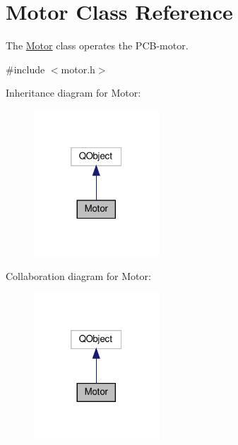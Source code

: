 \hypertarget{classMotor}{}\section{Motor Class Reference}
\label{classMotor}


The \hyperlink{classMotor}{Motor} class operates the P\+C\+B-\/motor.  




{\ttfamily \#include $<$motor.\+h$>$}



Inheritance diagram for Motor\+:
\nopagebreak
\begin{figure}[H]
\begin{center}
\leavevmode
\includegraphics[width=133pt]{classMotor__inherit__graph}
\end{center}
\end{figure}


Collaboration diagram for Motor\+:
\nopagebreak
\begin{figure}[H]
\begin{center}
\leavevmode
\includegraphics[width=133pt]{classMotor__coll__graph}
\end{center}
\end{figure}
